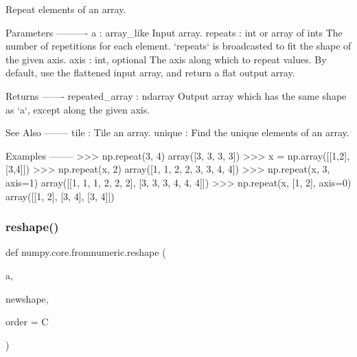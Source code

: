 \begin{DoxyVerb}Repeat elements of an array.

Parameters
----------
a : array_like
    Input array.
repeats : int or array of ints
    The number of repetitions for each element.  `repeats` is broadcasted
    to fit the shape of the given axis.
axis : int, optional
    The axis along which to repeat values.  By default, use the
    flattened input array, and return a flat output array.

Returns
-------
repeated_array : ndarray
    Output array which has the same shape as `a`, except along
    the given axis.

See Also
--------
tile : Tile an array.
unique : Find the unique elements of an array.

Examples
--------
>>> np.repeat(3, 4)
array([3, 3, 3, 3])
>>> x = np.array([[1,2],[3,4]])
>>> np.repeat(x, 2)
array([1, 1, 2, 2, 3, 3, 4, 4])
>>> np.repeat(x, 3, axis=1)
array([[1, 1, 1, 2, 2, 2],
       [3, 3, 3, 4, 4, 4]])
>>> np.repeat(x, [1, 2], axis=0)
array([[1, 2],
       [3, 4],
       [3, 4]])\end{DoxyVerb}
 \mbox{\label{namespacenumpy_1_1core_1_1fromnumeric_adc114e7baa60d8c41c25f59d83c8f731}} 
\subsubsection{\texorpdfstring{reshape()}{reshape()}}
{\footnotesize\ttfamily def numpy.\+core.\+fromnumeric.\+reshape (\begin{DoxyParamCaption}\item[{}]{a,  }\item[{}]{newshape,  }\item[{}]{order = {\ttfamily \textquotesingle{}C\textquotesingle{}} }\end{DoxyParamCaption})}

